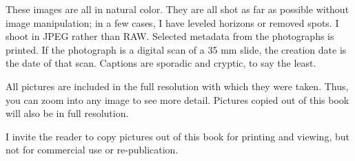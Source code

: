 These images are all in natural color. They are all shot as far as possible without image manipulation; in a few cases, I have leveled horizons or removed spots. I shoot in JPEG rather than RAW. Selected metadata from the photographs is printed. If the photograph is a digital scan of a 35 mm slide, the creation date is the date of that scan. Captions are sporadic and cryptic, to say the least.

All pictures are included in the full resolution with which they were taken. Thus, you can zoom into any image to see more detail. Pictures copied out of this book will also be in full resolution.

I invite the reader to copy pictures out of this book for printing and viewing, but not for commercial use or re-publication. 

